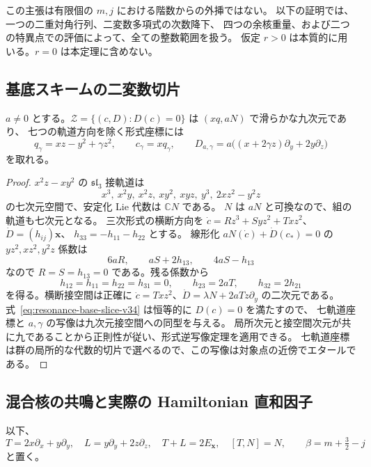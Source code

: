 この主張は有限個の $m,j$ における階数からの外挿ではない。
以下の証明では、一つの二重対角行列、二変数多項式の次数降下、
四つの余核重量、および二つの特異点での評価によって、全ての整数範囲を扱う。
仮定 $r>0$ は本質的に用いる。$r=0$ は本定理に含めない。

\subsection{基底スキームの二変数切片}

\begin{lemma}
\label{lem:resonance-base-slice-v34}
$a\ne0$ とする。$\mathscr Z=\{(c,D):D(c)=0\}$ は $(xq,aN)$ で滑らかな九次元であり、
七つの軌道方向を除く形式座標には
\begin{equation}
 q_\gamma=xz-y^2+\gamma z^2,\qquad
 c_\gamma=xq_\gamma,\qquad
 D_{a,\gamma}=a\bigl((x+2\gamma z)\partial_y+2y\partial_z\bigr)
 \label{eq:resonance-base-slice-v34}
\end{equation}
を取れる。
\end{lemma}

\begin{proof}
$x^2z-xy^2$ の $\mathfrak{sl}_3$ 接軌道は
\[
 x^3,\ x^2y,\ x^2z,\ xy^2,\ xyz,\ y^3,\ 2xz^2-y^2z
\]
の七次元空間で、安定化 Lie 代数は $\mathbb C N$ である。
$N$ は $aN$ と可換なので、組の軌道も七次元となる。
三次形式の横断方向を
$\dot c=Rz^3+Syz^2+Txz^2$、$\dot D=(h_{ij})\mathbf x$、
$h_{33}=-h_{11}-h_{22}$ とする。
線形化 $aN(\dot c)+\dot D(c_*)=0$ の $yz^2,xz^2,y^2z$ 係数は
\[
 6aR,\qquad aS+2h_{13},\qquad4aS-h_{13}
\]
なので $R=S=h_{13}=0$ である。残る係数から
\[
 h_{12}=h_{11}=h_{22}=h_{31}=0,\qquad
 h_{23}=2aT,\qquad h_{32}=2h_{21}
\]
を得る。横断接空間は正確に
$\dot c=Txz^2$、$\dot D=\lambda N+2aTz\partial_y$ の二次元である。
式~\eqref{eq:resonance-base-slice-v34} は恒等的に $D(c)=0$ を満たすので、
七軌道座標と $a,\gamma$ の写像は九次元接空間への同型を与える。
局所次元と接空間次元が共に九であることから正則性が従い、形式逆写像定理を適用できる。
七軌道座標は群の局所的な代数的切片で選べるので、この写像は対象点の近傍でエタールである。
\end{proof}

\subsection{混合核の共鳴と実際の Hamiltonian 直和因子}

以下、
\[
 T=2x\partial_x+y\partial_y,\quad
 L=y\partial_y+2z\partial_z,\quad
 T+L=2E_{\mathbf x},\quad[T,N]=N,
 \qquad\beta=m+\tfrac32-j
\]
と置く。

